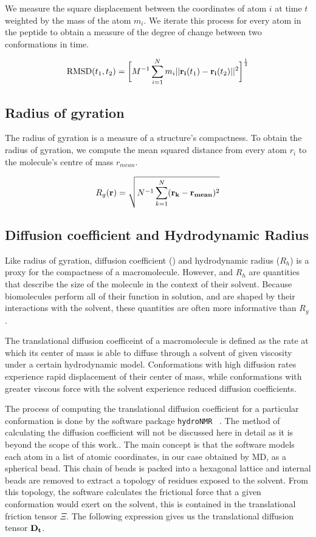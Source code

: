 We measure the square displacement between the coordinates of atom $i$ at time $t$ weighted by the mass of the atom $m_i$. We iterate this process for every atom in the peptide to obtain a measure of the degree of change between two conformations in time.

\begin{equation}
\text{RMSD}(t_1, t_2) = \bigg[ M^{-1} \sum_{i=1}^{N} m_{i} \lvert \lvert \mathbf{r_{i}}(t_{1}) - \mathbf{r_{i}}(t_{2}) \rvert \rvert^2 \bigg]^\frac{1}{2}
\end{equation}


\subsection{Radius of gyration}

The radius of gyration is a measure of a structure's compactness. To obtain the radius of gyration, we compute the mean squared distance from every atom $r_i$ to the molecule's centre of mass $r_{mean}$.

\begin{equation}
R_g(\mathbf{r}) = \sqrt{N^{-1} \sum_{k=1}^{N} (\mathbf{r_k} - \mathbf{r_{mean}})^2}
\end{equation}

\subsection{Diffusion coefficient and Hydrodynamic Radius}

Like radius of gyration, diffusion coefficient (\diffusion) and hydrodynamic radius ($R_h$) is a proxy for the compactness of a macromolecule. However, \diffusion and $R_h$ are quantities that describe the size of the molecule in the context of their solvent. Because biomolecules perform all of their function in solution, and are shaped by their interactions with the solvent, these quantities are often more informative than $R_g$.

The translational diffusion coefficeint of a macromolecule is defined as the rate at which its center of mass is able to diffuse through a solvent of given viscosity under a certain hydrodynamic model. Conformations with high diffusion rates experience rapid displacement of their center of mass, while conformations with greater viscous force with the solvent experience reduced diffusion coefficients. 

The process of computing the translational diffusion coefficient for a particular conformation is done by the software package \texttt{hydroNMR} ~\cite{de2000hydronmr}. The method of calculating the diffusion coefficient will not be discussed here in detail as it is beyond the scope of this work.. The main concept is that the software models each atom in a list of atomic coordinates, in our case obtained by MD, as a spherical bead. This chain of beads is packed into a hexagonal lattice and internal beads are removed to extract a topology of residues exposed to the solvent. From this topology, the software calculates the frictional force that a given conformation would exert on the solvent, this is contained in the translational friction tensor $\Xi$. The following expression gives us the translational diffusion tensor $\mathbf{D_t}$.

